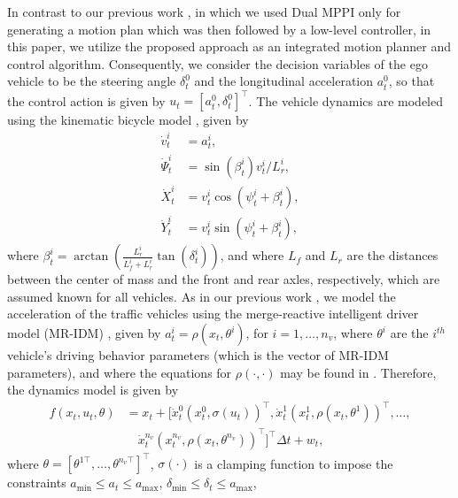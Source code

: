 \documentclass[letterpaper, 10 pt, conference]{IEEEconf}
\begin{document}
In contrast to our previous work \cite{knaup2024active}, in which we used Dual MPPI only for generating a motion plan which was then followed by a low-level controller, in this paper, we utilize the proposed approach as an integrated motion planner and control algorithm.
Consequently, we consider the decision variables of the ego vehicle to be the steering angle $\delta_{t}^{0}$ and the longitudinal acceleration $a_{t}^{0}$, so that the control action is given by
$u_{t} = [a_{t}^{0}, \delta_{t}^{0}]^{\top}$.
The vehicle dynamics are modeled using the kinematic bicycle model \cite{kong2015kinematic}, given by 
\begin{subequations}
    \begin{align}
        \dot{v}_{t}^{i} &= a_{t}^{i}, \\
        \dot{\Psi}_{t}^{i} &= \sin(\beta_{t}^{i}) v_{t}^{i} / L_{r}^{i}, \\
        \dot{X}_{t}^{i} &= v_{t}^{i} \cos(\psi_{t}^{i} + \beta_{t}^{i}), \\
        \dot{Y}_{t}^{i} &= v_{t}^{i} \sin(\psi_{t}^{i} + \beta_{t}^{i}),
    \end{align}
\end{subequations}
where $\beta_{t}^{i} = \arctan(\frac{L_{r}^{i}}{L_{f}^{i} + L_{r}^{i}} \tan(\delta_{t}^{i}))$, and where $L_{f}$ and $L_{r}$ are the distances between the center of mass and the front and rear axles, respectively, which are assumed known for all vehicles.
% 
As in our previous work \cite{knaup2024active}, we model the acceleration of the traffic vehicles using the merge-reactive intelligent driver model (MR-IDM) \cite{holley2023mr}, given by $a_{t}^{i} = \rho(x_{t}, \theta^{i})$, for $i=1, \dots, n_v$, where $\theta^{i}$ are the $i^{th}$ vehicle's driving behavior parameters (which is the vector of MR-IDM parameters), and where the equations for $\rho(\cdot, \cdot)$ may be found in \cite{holley2023mr}.
% 
Therefore, the dynamics model is given by
\begin{align}
    f(x_{t}, u_{t}, \theta) &= x_{t} + [\dot{x}_{t}^{0}(x_{t}^{0}, \sigma(u_{t}))^{\top}, \dot{x}_{t}^{1}(x_{t}^{1}, \rho(x_{t}, \theta^{1}))^{\top}, \dots, \nonumber\\ 
    &\quad \dot{x}_{t}^{n_v}(x_{t}^{n_v}, \rho(x_{t}, \theta^{n_v}))^{\top} ]^{\top} \Delta t + w_{t},
\end{align}
where $\theta = [\theta^{1 \top}, \dots, \theta^{n_v \top} ]^{\top}$, 
$\sigma(\cdot)$ is a clamping function to impose the constraints $a_{\mathrm{min}} \leq a_{t} \leq a_{\mathrm{max}}$, $\delta_{\mathrm{min}} \leq \delta_{t} \leq a_{\mathrm{max}}$,
\end{document}
